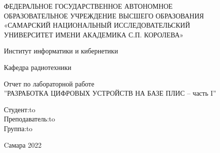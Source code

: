 \begin{titlepage}
\newpage
\doublespacing
\begin{center}
ФЕДЕРАЛЬНОЕ ГОСУДАРСТВЕННОЕ АВТОНОМНОЕ\\
ОБРАЗОВАТЕЛЬНОЕ УЧРЕЖДЕНИЕ ВЫСШЕГО ОБРАЗОВАНИЯ\\
«САМАРСКИЙ НАЦИОНАЛЬНЫЙ ИССЛЕДОВАТЕЛЬСКИЙ\\
УНИВЕРСИТЕТ ИМЕНИ АКАДЕМИКА С.П. КОРОЛЕВА»	
 \\
\end{center}

\vspace{5em}

\begin{center}
 Институт информатики и кибернетики \\ 
\end{center}

\begin{center}
Кафедра радиотехники \\ 
\end{center}


\vspace{3em}

\begin{center}
{Отчет по лабораторной работе\\''РАЗРАБОТКА ЦИФРОВЫХ УСТРОЙСТВ НА БАЗЕ ПЛИС -- часть I''}
\end{center}

\vspace{14em}



\newbox{\lbox}
\newlength{\maxl}
\setlength{\maxl}{\wd\lbox}
\hfill\parbox{7cm}{
\hspace*{4cm}\hspace*{-4cm}Студент:\hfill\hbox to\\
\hspace*{4cm}\hspace*{-4cm}Преподаватель:\hfill\hbox to\\
\hspace*{4cm}\hspace*{-4cm}Группа:\hfill\hbox to\\
}


\vspace{\fill}

\begin{center}
Cамара 2022
\end{center}

\end{titlepage}